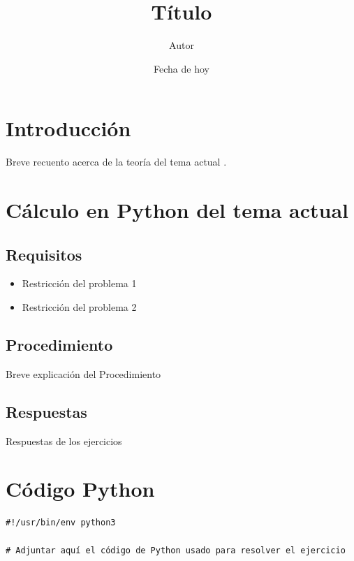 \documentclass[spanish]{article}
\begin{document}
\title {Título}
\author {Autor}
\date {Fecha de hoy}
\maketitle

\section {Introducción}

Breve recuento acerca de la teoría del tema actual \cite{fowler1998366}.




\section {Cálculo en Python del tema actual}


\subsection {Requisitos}

\begin {itemize}
\item Restricción del problema 1
\item Restricción del problema 2
\end {itemize}


\subsection {Procedimiento}

Breve explicación del Procedimiento


\subsection {Respuestas}

Respuestas de los ejercicios



\clearpage
\section*{Código Python}
\begin{verbatim}
#!/usr/bin/env python3

# Adjuntar aquí el código de Python usado para resolver el ejercicio
\end{verbatim}


% 
\clearpage

\end{document}

